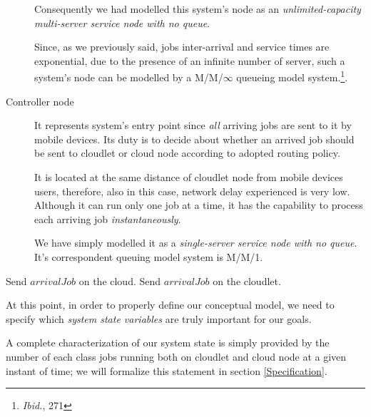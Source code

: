 \documentclass[10pt,a4paper]{article}
\begin{document}
\begin{description}
Consequently we had modelled this system's node as an \textit{unlimited-capacity multi-server service node with no queue}. 

Since, as we previously said, jobs inter-arrival and service times are exponential, due to the presence of an infinite number of server, such a system's node can be modelled by a M/M/$\infty$ queueing model system.\footnote{\textit{Ibid.}, 271}. 

\item[Controller node] It represents system's entry point since \textit{all} arriving jobs are sent to it by mobile devices. Its duty is to decide about whether an arrived job should be sent to cloudlet or cloud node according to adopted routing policy.

It is located at the same distance of cloudlet node from mobile devices users, therefore, also in this case, network delay experienced is very low. Although it can run only one job at a time, it has the capability to process each arriving job \textit{instantaneously}. 

We have simply modelled it as a \textit{single-server service node with no queue}. It's correspondent queuing model system is M/M/1.

\end{description}




\begin{algorithm}

\caption{}\label{alg:accessControlAlgorithm1}

\begin{algorithmic}[1]


	\State Send $\textit{arrivalJob}$ on the cloud.
\Else 	
 	\State Send $\textit{arrivalJob}$ on the cloudlet.
\EndIf

\EndFunction

\end{algorithmic}
\end{algorithm}

At this point, in order to properly define our conceptual model, we need to specify which \textit{system state variables} are truly important for our goals.

A complete characterization of our system state is simply provided by the number of each class jobs running both on cloudlet and cloud node at a given instant of time; we will formalize this statement in section \ref{Specification}. 
\end{document}
